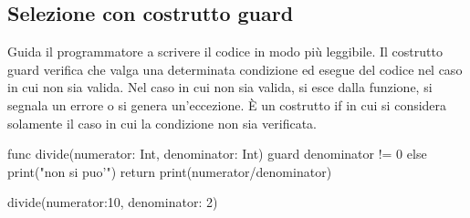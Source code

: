 \subsection{Selezione con costrutto guard}
Guida il programmatore a scrivere il codice in modo più leggibile. Il costrutto guard verifica che valga una determinata condizione ed esegue del codice nel caso in cui non sia valida.
Nel caso in cui non sia valida, si esce dalla funzione, si segnala un errore o si genera un'eccezione.
È un costrutto if in cui si considera solamente il caso in cui la condizione non sia verificata.
\begin{Swift}
    func divide(numerator: Int, denominator: Int) {
        guard denominator != 0 else {
            print("non si puo'")
            return
        }
        print(numerator/denominator)
    }
    
    divide(numerator:10, denominator: 2)
\end{Swift}

